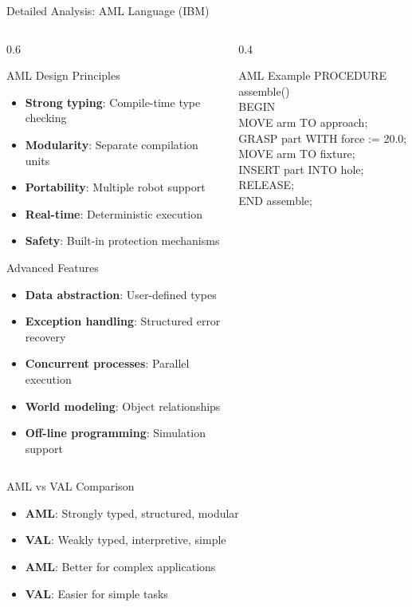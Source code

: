 \documentclass[10pt,aspectratio=169]{beamer}
\begin{document}
\begin{frame}{Detailed Analysis: AML Language (IBM)}
\begin{columns}[T]
\begin{column}{0.6\textwidth}
\begin{block}{AML Design Principles}
\begin{itemize}
\item \textbf{Strong typing}: Compile-time type checking
\item \textbf{Modularity}: Separate compilation units
\item \textbf{Portability}: Multiple robot support
\item \textbf{Real-time}: Deterministic execution
\item \textbf{Safety}: Built-in protection mechanisms
\end{itemize}
\end{block}
\begin{alertblock}{Advanced Features}
\begin{itemize}
\item \textbf{Data abstraction}: User-defined types
\item \textbf{Exception handling}: Structured error recovery
\item \textbf{Concurrent processes}: Parallel execution
\item \textbf{World modeling}: Object relationships
\item \textbf{Off-line programming}: Simulation support
\end{itemize}
\end{alertblock}
\end{column}
\begin{column}{0.4\textwidth}
\begin{exampleblock}{AML Example}
\ttfamily
PROCEDURE assemble()\\
BEGIN\\
\quad MOVE arm TO approach;\\
\quad GRASP part WITH force := 20.0;\\
\quad MOVE arm TO fixture;\\
\quad INSERT part INTO hole;\\
\quad RELEASE;\\
END assemble;
\end{exampleblock}
\end{column}
\end{columns}

\begin{block}{AML vs VAL Comparison}
\begin{itemize}
\item \textbf{AML}: Strongly typed, structured, modular
\item \textbf{VAL}: Weakly typed, interpretive, simple
\item \textbf{AML}: Better for complex applications
\item \textbf{VAL}: Easier for simple tasks
\end{itemize}
\end{block}
\end{frame}
\end{document}
